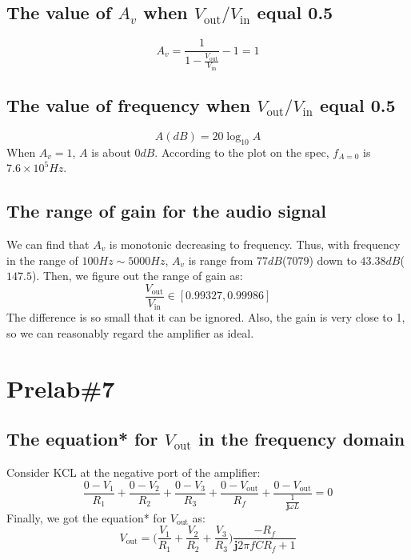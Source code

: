 \documentclass{IEEEtran}
\begin{document}
	\subsection{The value of $A_v$ when $V_{\mathrm{out}}/V_{\mathrm{in}}$ equal 0.5}
	\begin{equation*}
		A_v = \frac{1}{1-\frac{V_{\mathrm{out}}}{V_{\mathrm{in}}}} - 1 = 1
	\end{equation*}
	\subsection{The value of frequency when $V_{\mathrm{out}}/V_{\mathrm{in}}$ equal 0.5}
	\begin{equation*}
		A(\si{dB}) = 20\log_{10}{A}
	\end{equation*}
	\phantom{ } When $A_v=1$, $A$ is about $0\si{dB}$. According to the plot on the spec, $f_{A=0}$ is $7.6\times10^5\si{Hz}$.
	\subsection{The range of gain for the audio signal}
	We can find that $A_v$ is monotonic decreasing to frequency. Thus, with frequency in the range of $100\si{Hz}\sim5000\si{Hz}$, $A_v$ is range from $77\si{dB}$($7079$) down to $43.38\si{dB}$($147.5$). Then, we figure out the range of gain as:
	\begin{equation*}
		\frac{V_{\mathrm{out}}}{V_{\mathrm{in}}} \in [0.99327, 0.99986]
	\end{equation*}
	The difference is so small that it can be ignored. Also, the gain is very close to 1, so we can reasonably regard the amplifier as ideal.
	
	\section{\textbf{Prelab\#7}}
	\subsection{The equation* for $V_{\mathrm{out}}$ in the frequency domain}
	Consider KCL at the negative port of the amplifier:
	\begin{equation*}
		\frac{0-V_1}{R_1} + \frac{0-V_2}{R_2} + \frac{0-V_3}{R_3} + \frac{0-V_{\mathrm{out}}}{R_f} + \frac{0-V_{\mathrm{out}}}{\frac{1}{\mathbf{j}\omega L}} = 0
	\end{equation*}
	Finally, we got the equation* for $V_{\mathrm{out}}$ as:
	\begin{equation*}
		V_{\mathrm{out}} = \bigg(\frac{V_1}{R_1} + \frac{V_2}{R_2} + \frac{V_3}{R_3}\bigg) \frac{-R_f}{\mathbf{j}2\pi fCR_f+1}
	\end{equation*}
\end{document}
